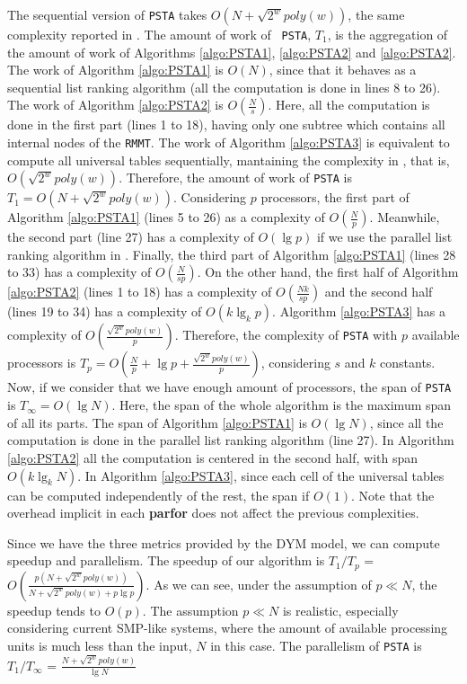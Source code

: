 The sequential version of {\tt PSTA} takes $O(N+\sqrt{2^{w}}poly(w))$,
the same complexity reported in
\cite{Navarro:2014:FFS:2620785.2601073}. The amount of work of {\tt
PSTA}, $T_1$, is the aggregation of the amount of work of Algorithms \ref{algo:PSTA1},
\ref{algo:PSTA2} and \ref{algo:PSTA2}. The work of Algorithm \ref{algo:PSTA1} is $O(N)$,
since that it behaves as a sequential list ranking algorithm (all the computation is
done in lines 8 to 26). The work of Algorithm \ref{algo:PSTA2} is $O(\frac{N}{s})$. Here,
all the computation is done in the first part (lines 1 to 18), having only one
subtree which contains all internal nodes of the {\tt RMMT}. The work of Algorithm \ref{algo:PSTA3} is equivalent to compute all universal tables sequentially, mantaining
the complexity in \cite{Navarro:2014:FFS:2620785.2601073}, that is, $O(\sqrt{2^{w}}poly(w))$. Therefore, the amount of work of {\tt PSTA} is $T_{1}=O(N+\sqrt{2^{w}}poly(w))$. Considering $p$ processors, the first part of Algorithm \ref{algo:PSTA1} (lines 5 to 26) as a complexity of $O(\frac{N}{p})$. Meanwhile, the second part (line 27) has a complexity of $O(\lg p)$ if we use the parallel list ranking algorithm in \cite{Reif1993}. Finally, the third part of Algorithm \ref{algo:PSTA1} (lines 28 to 33) has a complexity of $O(\frac{N}{sp})$. On the other hand, the first half of Algorithm \ref{algo:PSTA2} (lines 1 to 18) has a complexity of $O(\frac{Nk}{sp})$ and the second half (lines 19 to 34) has a complexity of $O(k\lg_{k}p)$. Algorithm \ref{algo:PSTA3} has a complexity of $O(\frac{\sqrt{2^{w}}poly(w)}{p})$. Therefore, the complexity of {\tt PSTA} with $p$ available processors is $T_p =
O(\frac{N}{p}+\lg p+\frac{\sqrt{2^{w}}poly(w)}{p})$, considering $s$ and $k$ constants. Now, if we consider that we have enough amount of processors, the span of {\tt PSTA} is $T_{\infty}=O(\lg N)$. Here, the span of the whole algorithm is the maximum span of all its parts. The span of Algorithm \ref{algo:PSTA1} is $O(\lg N)$, since all the computation is done in the parallel list ranking algorithm (line 27). In Algorithm \ref{algo:PSTA2} all the computation is centered in the second half, with span $O(k\lg_{k}N)$. In Algorithm \ref{algo:PSTA3}, since each cell of the universal tables can be computed independently of the rest, the span if $O(1)$. Note that the overhead implicit in each {\bf parfor} does not affect the previous complexities.

Since we have the three metrics provided by the DYM model, we can
compute speedup and parallelism. The speedup of our algorithm is $T_1/T_p$ =
$O(\frac{p(N+\sqrt{2^{w}}poly(w))}{N+\sqrt{2^{w}}poly(w)+p\lg p})$. As we can see,
under the assumption of $p\ll N$, the speedup tends to $O(p)$. The assumption
$p\ll N$ is realistic, especially considering current SMP-like
systems, where the amount of available processing units is much less than the
input, $N$ in this case. The parallelism of {\tt PSTA} is $T_1/T_{\infty}$ =
$\frac{N+\sqrt{2^{w}}poly(w)}{\lg N}$ 

